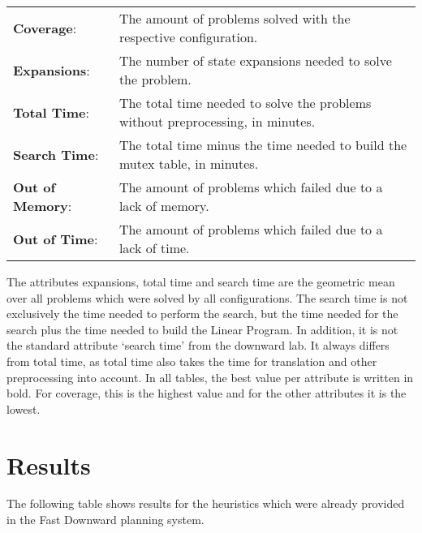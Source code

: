 \begin{center}
    \begin{tabularx}{\textwidth}{@{}lX@{}}
        \textbf{Coverage}: & The amount of problems solved with the respective configuration. \\
        \textbf{Expansions}: & The number of state expansions needed to solve the problem. \\
        \textbf{Total Time}: & The total time needed to solve the problems without preprocessing, in minutes. \\
        \textbf{Search Time}: & The total time minus the time needed to build the mutex table, in minutes. \\
        \textbf{Out of Memory}: & The amount of problems which failed due to a lack of memory. \\
        \textbf{Out of Time}: & The amount of problems which failed due to a lack of time. \\
    \end{tabularx}
\end{center}

The attributes expansions, total time and search time are the geometric mean over all problems which were solved by all configurations.
The search time is not exclusively the time needed to perform the search, but the time needed for the search plus the time needed to build the Linear Program.
In addition, it is not the standard attribute `search time' from the downward lab.
It always differs from total time, as total time also takes the time for translation and other preprocessing into account.
In all tables, the best value per attribute is written in bold.
For coverage, this is the highest value and for the other attributes it is the lowest.

\section{Results}\label{sec:results}
The following table shows results for the heuristics which were already provided in the Fast Downward planning system.

